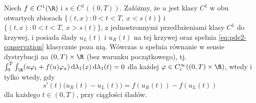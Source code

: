 \begin{stwierdzenie}
\label{prop:pde2-rh}
Niech $f\in C^1(\R)$ i $s\in C^1((0,T))$.
Załóżmy, że $u$ jest klasy $C^1$ w obu otwartych zbiorach
$\{(t,x):0<t<T,\ x<s(t)\}$ i
$\{(t,x):0<t<T,\ x>s(t)\}$, z jednostronnymi przedłużeniami
klasy $C^1$ do krzywej, i posiada ślady
$u_L(t)$ i $u_R(t)$ na tej krzywej oraz spełnia
\eqref{eq:pde2-conservation} klasycznie poza nią.
Wówczas $u$ spełnia równanie w sensie dystrybucji
na $(0,T)\times\R$ (bez warunku początkowego), tj.
$\int_0^T\int_\R (u\varphi_t+f(u)\varphi_x)\,
\mathrm d\lambda_1(x)\,\mathrm d\lambda_1(t)=0$
dla każdej $\varphi\in C_c^\infty((0,T)\times\R)$,
wtedy i tylko wtedy, gdy
\begin{equation}\label{eq:pde2-rh}
 s'(t)\bigl(u_R(t)-u_L(t)\bigr)
 =f(u_R(t))-f(u_L(t))
\end{equation}
dla każdego $t\in(0,T)$, przy ciągłości śladów.
\end{stwierdzenie}

